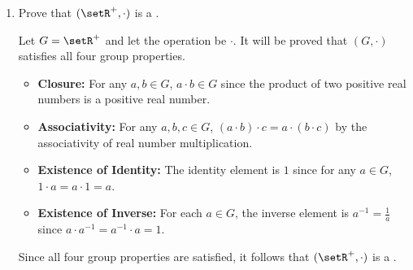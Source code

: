 \begin{enumerate}
\begin{subprove}
\begin{itemize}
      \item \textbf{Existence of Inverse:} For each \(a \in G\), there does not exist an inverse element \(a^{-1} \in G\) such that \(a + a^{-1} = a^{-1} + a = e\) since the only candidate for the inverse element is \(-a\), which is not in \(G\).
    \end{itemize}
    Since the existence of identity and existence of inverse properties are not satisfied, it follows that \((\setR^{+}, +)\) is not a .
  \end{subprove}
  \item Prove that \((\setR^{+}, \cdot)\) is a .
  \begin{subprove}
    Let \(G = \setR^{+}\) and let the operation be \(\cdot\).
    It will be proved that \((G, \cdot)\) satisfies all four group properties.
    \begin{itemize}
      \item \textbf{Closure:} For any \(a, b \in G\), \(a \cdot b \in G\) since the product of two positive real numbers is a positive real number.
      \item \textbf{Associativity:} For any \(a, b, c \in G\), \((a \cdot b) \cdot c = a \cdot (b \cdot c)\) by the associativity of real number multiplication.
      \item \textbf{Existence of Identity:} The identity element is \(1\) since for any \(a \in G\), \(1 \cdot a = a \cdot 1 = a\).
      \item \textbf{Existence of Inverse:} For each \(a \in G\), the inverse element is \(a^{-1} = \frac{1}{a}\) since \(a \cdot a^{-1} = a^{-1} \cdot a = 1\).
    \end{itemize}
    Since all four group properties are satisfied, it follows that \((\setR^{+}, \cdot)\) is a .
  \end{subprove}
\end{enumerate}



















